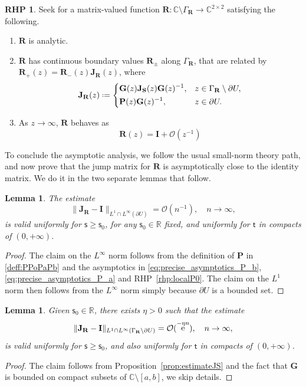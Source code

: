 \documentclass[reqno,a4paper,11pt]{amsart}
\DeclareMathOperator{\ee}{\rm e}
\newcommand{\C}{\mathbb{C}}
\newcommand{\R}{\mathbb{R}}
\newcommand{\Boh}{\mathcal{O}}
\newcommand*{\deff}{\mathrel{\vcenter{\baselineskip0.5ex \lineskiplimit0pt
                     \hbox{\scriptsize.}\hbox{\scriptsize.}}}%
                     =}
\renewcommand{\bm}{\mathbf}
\newcommand{\msf}{\mathsf}
\newcommand{\tad}{\msf t}
\newcommand{\sad}{\msf s}
\newtheorem{lemma}[theorem]{Lemma}
\theoremstyle{definition}
\newtheorem{rhp}[theorem]{RHP}
\theoremstyle{remark}
\numberwithin{equation}{section}
\begin{document}
  \begin{rhp}
        Seek for a matrix-valued function $\bm R : \C \setminus \Gamma_{\bm R} \to \C^{2 \times 2}$ satisfying the following.
        \begin{enumerate}[\rm (i)]
            \item $\bm R$ is analytic.
            \item $\bm R$ has continuous boundary values $\bm R_{\pm}$ along $\Gamma_{\bm R}$, that are related by $\bm R_+(z) = \bm R_-(z) \bm J_{\bm R}(z)$, where
            \begin{equation}\label{deff:JR}
                \bm J_{\bm R}(z) \deff
                    \begin{dcases}
                        \bm G(z) \bm J_{\bm S}(z)\bm G(z)^{-1}, & z\in \Gamma_{\bm R}\setminus \partial U, \\
                        \bm P(z)\bm G(z)^{-1}, & z\in \partial U.
                    \end{dcases}
            \end{equation}
            \item As $z \to \infty$, $\bm R$ behaves as 
            \[
                \bm R(z) = \bm I + \Boh \left(z^{-1} \right)
            \]
        \end{enumerate}
    \end{rhp}

To conclude the asymptotic analysis, we follow the usual small-norm theory path, and now prove that the jump matrix for $\bm R$ is asymptotically close to the identity matrix. We do it in the two separate lemmas that follow.

\begin{lemma}
    The estimate
    $$
    \|\bm J_{\bm R}-\bm I\|_{L^1\cap L^\infty (\partial U)}=\Boh(n^{-1}),\quad n\to\infty,
    $$
    is valid uniformly for $\sad\geq \sad_0$, for any $\sad_0\in \R$ fixed, and uniformly for $\tad$ in compacts of $(0,+\infty)$.
\end{lemma}
\begin{proof}
    The claim on the $L^\infty$ norm follows from the definition of $\bm P$ in \eqref{deff:PPoPaPb} and the asymptotics in \eqref{eq:precise_asymptotics_P_b}, \eqref{eq:precise_asymptotics_P_a} and RHP~\ref{rhp:localP0}. The claim on the $L^1$ norm then follows from the $L^\infty$ norm simply because $\partial U$ is a bounded set.
\end{proof}

\begin{lemma}
    Given $\sad_0\in \R$, there exists $\eta>0$ such that the estimate
    $$
    \|\bm J_{\bm R}-\bm I\|_{L^1\cap L^\infty (\Gamma_{\bm R}\setminus \partial U)}=\Boh(\ee^{-\eta n}),\quad n\to\infty,
    $$
    is valid uniformly for $\sad\geq \sad_0$, and also uniformly for $\tad$ in compacts of $(0,+\infty)$.
\end{lemma}
\begin{proof}
The claim follows from Proposition~\ref{prop:estimateJS} and the fact that $\bm G$ is bounded on compact subsets of $\C\setminus [a,b]$, we skip details.
\end{proof}
\end{document}
